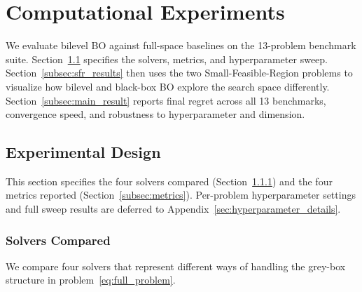 \documentclass[12pt,a4paper]{article}%
\theoremstyle{plain}%
\theoremstyle{remark}%
\theoremstyle{definition}%
\begin{document}

\section{Computational Experiments}\label{sec:experiments}\label{sec:results}

We evaluate bilevel BO against full-space baselines on the 13-problem benchmark suite. Section~\ref{sec:experimental_setup} specifies the solvers, metrics, and hyperparameter sweep. Section~\ref{subsec:sfr_results} then uses the two Small-Feasible-Region problems to visualize how bilevel and black-box BO explore the search space differently. Section~\ref{subsec:main_result} reports final regret across all 13 benchmarks, convergence speed, and robustness to hyperparameter and dimension.

\subsection{Experimental Design}\label{sec:experimental_setup}

This section specifies the four solvers compared (Section~\ref{subsec:solvers_compared}) and the four metrics reported (Section~\ref{subsec:metrics}). Per-problem hyperparameter settings and full sweep results are deferred to Appendix~\ref{sec:hyperparameter_details}.

\subsubsection{Solvers Compared}\label{subsec:solvers_compared}

We compare four solvers that represent different ways of handling the grey-box structure in problem~\eqref{eq:full_problem}.
\end{document}
